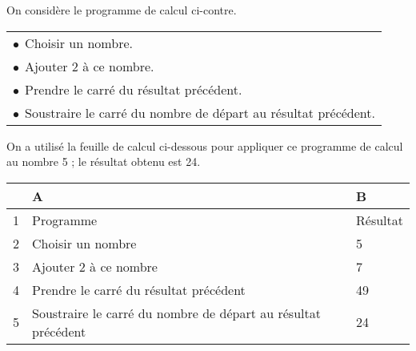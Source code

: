 
\medskip

\parbox{0.48\linewidth}{On considère le programme de calcul ci-contre.}\hfill
\parbox{0.48\linewidth}{\begin{tabularx}{\linewidth}{|X|}\hline
$\bullet~~$Choisir un nombre.\\
$\bullet~~$Ajouter 2 à ce nombre.\\
$\bullet~~$Prendre le carré du résultat précédent.\\
$\bullet~~$Soustraire le carré du nombre de départ au résultat précédent.\\ \hline
\end{tabularx}}

\medskip

On a utilisé la feuille de calcul ci-dessous pour appliquer ce programme de calcul au nombre 5 ; le résultat obtenu est 24.

\begin{center}
\begin{tabularx}{\linewidth}{|c|l|X|}\hline
&A&B\\ \hline
1& Programme&Résultat\\ \hline
2& Choisir un nombre &5\\ \hline
3& Ajouter 2 à ce nombre &7\\ \hline
4& Prendre le carré du résultat précédent &49\\ \hline
5& Soustraire le carré du nombre de départ au résultat précédent &24\\ \hline
\end{tabularx}
\end{center}

\smallskip

